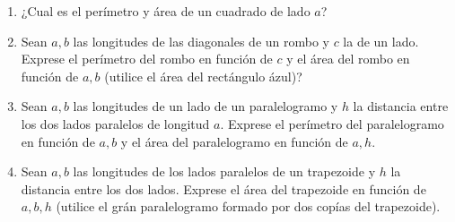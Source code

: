 \begin{enumerate}
\item
 ¿Cual es el perímetro y área de un cuadrado de lado $a$?

\begin{center}
\end{center}

\item Sean $a,b$ las longitudes de las diagonales de un rombo y $c$ la de
  un lado. Exprese el perímetro del rombo en función de $c$ y
  el área del rombo en función de $a,b$ (utilice el área del rectángulo ázul)?
  
\begin{center}
\end{center}

\item Sean $a,b$ las longitudes de un lado de un paralelogramo y $h$ la
  distancia entre los dos lados paralelos de longitud $a$. 
  Exprese el perímetro del paralelogramo en función de $a,b$ y
  el área del paralelogramo en función de $a,h$.

\begin{center}
\end{center}

\item Sean $a,b$ las longitudes de los lados paralelos de un trapezoide y $h$ la
  distancia entre los dos lados.
  Exprese el área del trapezoide en función de $a,b,h$ (utilice el grán
  paralelogramo formado por dos copías del trapezoide).


\end{enumerate}
